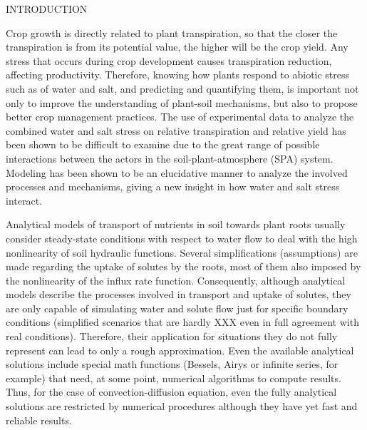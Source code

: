 \cleardoublepage

\def\quic{Quirijn's COMMENT: }

\chap INTRODUCTION

Crop growth is directly related to plant transpiration, so that the closer the transpiration is from its potential value, the higher will be the crop yield. 
Any stress that occurs during crop development causes transpiration reduction, affecting productivity. 
Therefore, knowing how plants respond to abiotic stress such as of water and salt, and predicting and quantifying them, is important not only to improve the understanding of plant-soil mechanisms, but also to propose better crop management practices.
The use of experimental data to analyze the combined water and salt stress on relative transpiration and relative yield has been shown to be difficult to examine due to the great range of possible interactions between the actors in the soil-plant-atmosphere (SPA) system.
Modeling has been shown to be an elucidative manner to analyze the involved processes and mechanisms, giving a new insight in how water and salt stress interact.

Analytical models of transport of nutrients in soil towards plant roots usually consider steady-state conditions with respect to water flow to deal with the high nonlinearity of soil hydraulic functions. 
Several simplifications (assumptions) are made regarding the uptake of solutes by the roots, most of them also imposed by the nonlinearity of the influx rate function. 
Consequently, although analytical models describe the processes involved in transport and uptake of solutes, they are only capable of simulating water and solute flow just for specific boundary conditions (simplified scenarios that are hardly XXX even in full agreement with real conditions). 
Therefore, their application for situations they do not fully represent can lead to only a rough approximation.
Even the available analytical solutions include special math functions (Bessels, Airys or infinite series, for example) that need, at some point, numerical algorithms to compute results.
Thus, for the case of convection-diffusion equation, even the fully analytical solutions are restricted by numerical procedures although they have yet fast and reliable results.

